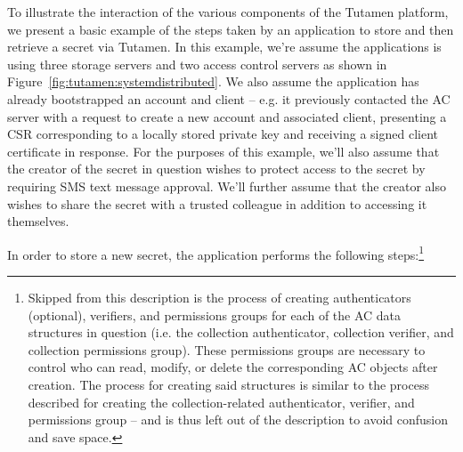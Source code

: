 To illustrate the interaction of the various components of the Tutamen
platform, we present a basic example of the steps taken by an
application to store and then retrieve a secret via Tutamen. In this
example, we're assume the applications is using three storage servers
and two access control servers as shown in
Figure~\ref{fig:tutamen:systemdistributed}. We also assume the
application has already bootstrapped an account and client -- e.g. it
previously contacted the AC server with a request to create a new
account and associated client, presenting a CSR corresponding to a
locally stored private key and receiving a signed client certificate
in response. For the purposes of this example, we'll also assume that
the creator of the secret in question wishes to protect access to the
secret by requiring SMS text message approval. We'll further assume
that the creator also wishes to share the secret with a trusted
colleague in addition to accessing it themselves.

In order to store a new secret, the application performs the following
steps:\footnote{Skipped from this description is the process of
  creating authenticators (optional), verifiers, and permissions
  groups for each of the AC data structures in question (i.e. the
  collection authenticator, collection verifier, and collection
  permissions group). These permissions groups are necessary to
  control who can read, modify, or delete the corresponding AC objects
  after creation. The process for creating said structures is similar
  to the process described for creating the collection-related
  authenticator, verifier, and permissions group -- and is thus left
  out of the description to avoid confusion and save space.}

